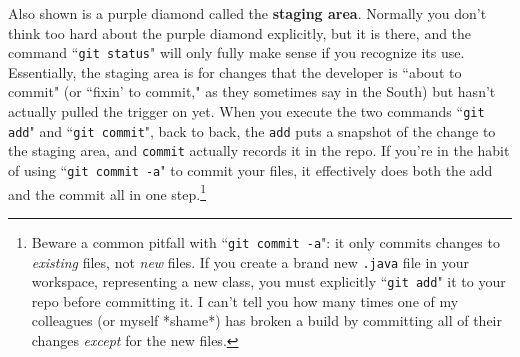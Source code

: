 Also shown is a purple diamond called the \textbf{staging area}. Normally you
don't think too hard about the purple diamond explicitly, but it is there, and
the command ``\texttt{git status}" will only fully make sense if you recognize
its use. Essentially, the staging area is for changes that the developer is
``about to commit" (or ``fixin' to commit," as they sometimes say in the
South) but hasn't actually pulled the trigger on yet. When you execute the two
commands ``\texttt{git add}" and ``\texttt{git commit}", back to back, the
\texttt{add} puts a snapshot of the change to the staging area, and
\texttt{commit} actually records it in the repo. If you're in the habit of
using ``\texttt{git commit -a}" to commit your files, it effectively does both
the add and the commit all in one step.\footnote{Beware a common pitfall with
``\texttt{git commit -a}": it only commits changes to \textit{existing} files,
not \textit{new} files. If you create a brand new \texttt{.java} file in your
workspace, representing a new class, you must explicitly ``\texttt{git add}"
it to your repo before committing it. I can't tell you how many times one of
my colleagues (or myself *shame*) has broken a build by committing all of
their changes \textit{except} for the new files.}
